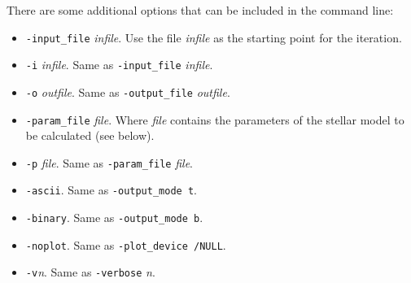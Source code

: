 There are some additional options that can be included in the command line:
\begin{itemize}
\item[] {\tt -input\_file} {\it infile}. Use the file {\it infile} as the starting point
for the iteration.
\item[] {\tt -i} {\it infile}. Same as {\tt -input\_file} {\it infile}.
\item[] {\tt -o} {\it outfile}. Same as {\tt -output\_file} {\it outfile}.
\item[] {\tt -param\_file} {\it file}. Where {\it file} contains the parameters of the 
stellar model to be calculated (see below).
\item[] {\tt -p} {\it file}. Same as {\tt -param\_file} {\it file}.
\item[] {\tt -ascii}. Same as {\tt -output\_mode t}.
\item[] {\tt -binary}. Same as {\tt -output\_mode b}.
\item[] {\tt -noplot}. Same as {\tt -plot\_device /NULL}.
\item[] {\tt -v}{\it n}. Same as {\tt -verbose} {\it n}.
\end{itemize}


